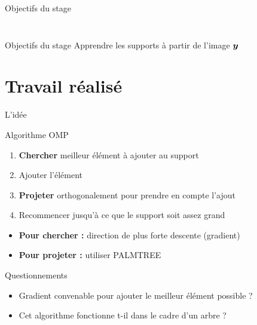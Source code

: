 \begin{frame}{Objectifs du stage}
\begin{columns}
\begin{column}{0.20\textwidth}
\begin{figure}
\end{figure}\end{column}
\end{columns}
\begin{exampleblock}{Objectifs du stage}
Apprendre les supports à partir de l'image $\bm{y}$
\end{exampleblock}
\end{frame}




\section{Travail réalisé}

\begin{frame}{L'idée}
\begin{block}{Algorithme OMP}
	\begin{enumerate}
		\item \textbf{Chercher} meilleur élément à ajouter au support
		\item Ajouter l'élément
		\item \textbf{Projeter} orthogonalement pour prendre en compte l'ajout
		\item Recommencer jusqu'à ce que le support soit assez grand
	\end{enumerate}
\end{block}
\begin{itemize}
\item \textbf{Pour chercher :} direction de plus forte descente (gradient)
\item \textbf{Pour projeter :} utiliser PALMTREE
\end{itemize}
\begin{exampleblock}{Questionnements}
\begin{itemize}
	\item Gradient convenable pour ajouter le meilleur élément possible ?
	\item Cet algorithme fonctionne t-il dans le cadre d'un arbre ?
\end{itemize}
\end{exampleblock}
\end{frame}

